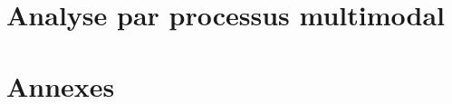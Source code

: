 \documentclass[english,standardlists]{spimubphdthesis}
\begin{document}
\part{Analyse par processus multimodal}
\label{part:multimodal}






\part{Annexes}
\label{part:annexes}	



			
\backmatter





\listoffigures

\listoftables


\printglossary[type=\acronymtype,style=listaltacr,title={Liste des acronymes}]

\appendix
\end{document}
